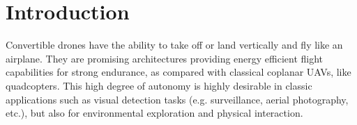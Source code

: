 \chapter*{Introduction}

Convertible drones have the ability to take off or land vertically and fly like an airplane. They are promising architectures providing energy efficient flight capabilities for strong endurance, as compared with classical coplanar UAVs, like quadcopters. This high degree of autonomy is highly desirable in classic applications such as visual detection tasks (e.g. surveillance, aerial photography, etc.), but also for environmental exploration and physical interaction.
\cite{liu2019robust}

